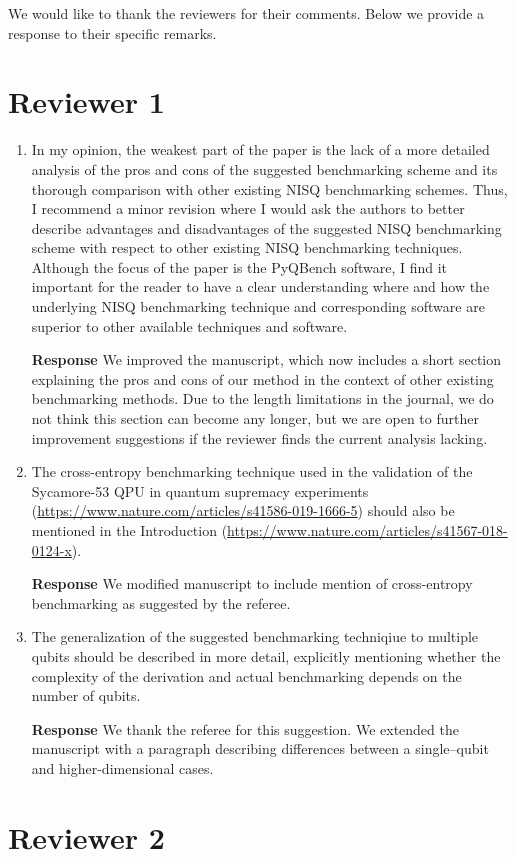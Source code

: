 \documentclass[a4paper,12pt]{article}
\newcommand{\1}{{\rm 1\hspace{-0.9mm}l}}
\newenvironment{response}{\vspace{1em}\noindent\textbf{Response}}{\vspace{1em}}
\begin{document}
We would like to thank the reviewers for their comments. Below we provide
a response to their specific remarks.

\section{Reviewer 1}

\begin{enumerate}
  \item[] In my opinion, the weakest part of the paper is the lack of a more detailed analysis of the pros and cons of the suggested benchmarking scheme and its thorough comparison with other existing NISQ benchmarking schemes. Thus, I recommend a minor revision where I would ask the authors to better describe advantages and disadvantages of the suggested NISQ benchmarking scheme with respect to other existing NISQ benchmarking techniques. Although the focus of the paper is the PyQBench software, I find it important for the reader to have a clear understanding where and how the underlying NISQ benchmarking technique and corresponding software are superior to other available techniques and software.

  \begin{response}
    We improved the manuscript, which now includes a short section explaining the pros and cons of our method in the context of other existing benchmarking methods. Due to the length limitations in the journal, we do not think this section can become any longer, but we are open to further improvement suggestions if the reviewer finds the current analysis lacking.
  \end{response}
  \item The cross-entropy benchmarking technique used in the validation of the Sycamore-53 QPU in
    quantum supremacy experiments (\url{https://www.nature.com/articles/s41586-019-1666-5}) should also
    be mentioned in the Introduction (\url{https://www.nature.com/articles/s41567-018-0124-x}).

    \begin{response} We modified manuscript to include mention of cross-entropy benchmarking as
      suggested by the referee.
    \end{response}
  \item The generalization of the suggested benchmarking techniqiue to multiple qubits should be
    described in more detail, explicitly mentioning whether the complexity of the derivation and
    actual benchmarking depends on the number of qubits.

    \begin{response} We thank the referee for this suggestion. We extended the manuscript with a
      paragraph describing differences between a single--qubit and higher-dimensional cases.
    \end{response}

\end{enumerate}
\section{Reviewer 2}
\end{document}
